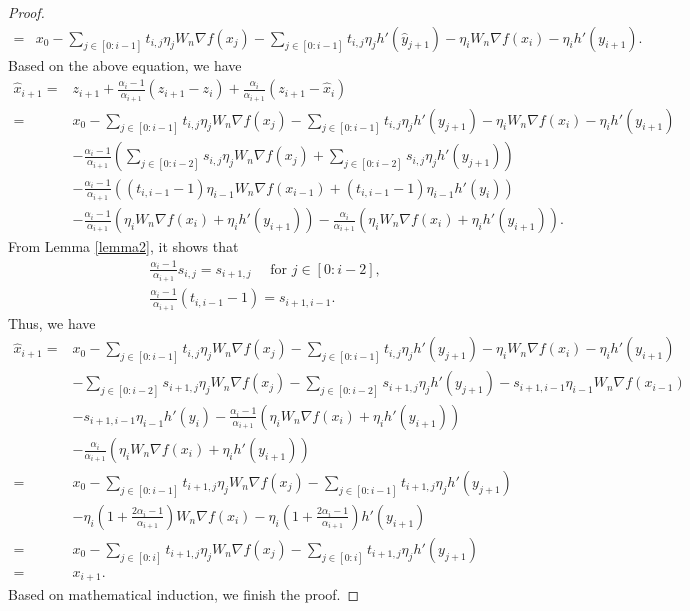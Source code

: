 \documentclass{article}
\begin{document}
\begin{proof}
\begin{align*}
=& x_{0}-\sum_{j\in[0:i-1]}t_{i,j}\eta_{j}W_{n}\nabla f(x_{j}) - \sum_{j\in[0:i-1]}t_{i,j}\eta_{j}h'(\hat{y}_{j+1}) -\eta_{i}W_{n}\nabla f(x_{i})-\eta_{i}h'(y_{i+1}).
\end{align*}
Based on the above equation, we have
\begin{align*}
\hat{x}_{i+1}=&z_{i+1}+\frac{\alpha_{i}-1}{\alpha_{i+1}}(z_{i+1}-z_{i})+\frac{\alpha_{i}}{\alpha_{i+1}}(z_{i+1}-\hat{x}_{i})\\
=&x_{0}-\sum_{j\in[0:i-1]}t_{i,j}\eta_{j}W_{n}\nabla f(x_{j}) -\sum_{j\in[0:i-1]}t_{i,j}\eta_{j}h'(y_{j+1}) -\eta_{i}W_{n}\nabla f(x_{i}) -\eta_{i}h'(y_{i+1})\\
&-\frac{\alpha_{i}-1}{\alpha_{i+1}}(\sum_{j\in[0:i-2]}s_{i,j}\eta_{j}W_{n}\nabla f(x_{j})+\sum_{j\in[0:i-2]}s_{i,j}\eta_{j}h'(y_{j+1}))\\
&-\frac{\alpha_{i}-1}{\alpha_{i+1}}((t_{i,i-1}-1)\eta_{i-1}W_{n}\nabla f(x_{i-1}) +(t_{i,i-1}-1)\eta_{i-1}h'(y_{i}))\\
&-\frac{\alpha_{i}-1}{\alpha_{i+1}}(\eta_{i}W_{n}\nabla f(x_{i}) +\eta_{i}h'(y_{i+1})) -\frac{\alpha_{i}}{\alpha_{i+1}}(\eta_{i}W_{n}\nabla f(x_{i}) +\eta_{i}h'(y_{i+1})).
\end{align*}
From Lemma \ref{lemma2}, it shows that
\begin{align*}
&\frac{\alpha_{i}-1}{\alpha_{i+1}} s_{i,j}=s_{i+1,j}\quad \text{ for } j\in[0:i-2],\\
&\frac{\alpha_{i}-1}{\alpha_{i+1}}(t_{i,i-1}-1)=s_{i+1,i-1}.
\end{align*}
Thus, we have
\begin{align*}
\hat{x}_{i+1}=&x_{0}-\sum_{j\in[0:i-1]}t_{i,j}\eta_{j}W_{n}\nabla f(x_{j}) -\sum_{j\in[0:i-1]}t_{i,j}\eta_{j}h'(y_{j+1}) -\eta_{i}W_{n}\nabla f(x_{i}) -\eta_{i}h'(y_{i+1})\\
&-\sum_{j\in[0:i-2]}s_{i+1,j}\eta_{j}W_{n}\nabla f(x_{j}) -\sum_{j\in[0:i-2]}s_{i+1,j}\eta_{j}h'(y_{j+1}) -s_{i+1,i-1}\eta_{i-1}W_{n}\nabla f(x_{i-1})\\
&-s_{i+1,i-1}\eta_{i-1}h'(y_{i})-\frac{\alpha_{i}-1}{\alpha_{i+1}}(\eta_{i}W_{n}\nabla f(x_{i})+\eta_{i}h'(y_{i+1}))\\
&-\frac{\alpha_{i}}{\alpha_{i+1}}(\eta_{i}W_{n}\nabla f(x_{i})+\eta_{i}h'(y_{i+1}))\\
=& x_{0}-\sum_{j\in[0:i-1]}t_{i+1,j}\eta_{j}W_{n}\nabla f(x_{j}) -\sum_{j\in[0:i-1]}t_{i+1,j}\eta_{j}h'(y_{j+1}) \\
&-\eta_{i}(1+\frac{2\alpha_{i}-1}{\alpha_{i+1}})W_{n}\nabla f(x_{i}) -\eta_{i}(1+\frac{2\alpha_{i}-1}{\alpha_{i+1}})h'(y_{i+1})\\
=&x_{0}- \sum_{j\in[0:i]}t_{i+1,j}\eta_{j}W_{n}\nabla f(x_{j}) -\sum_{j\in[0:i]}t_{i+1,j}\eta_{j}h'(y_{j+1})\\
=&x_{i+1}.
\end{align*}
Based on mathematical induction, we finish the proof.
\end{proof}
\end{document}

